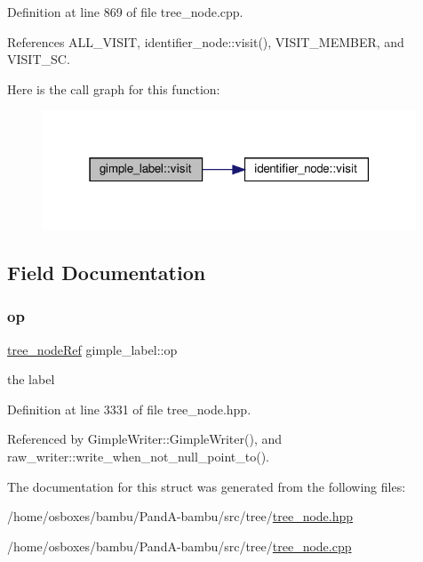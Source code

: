 Definition at line 869 of file tree\+\_\+node.\+cpp.



References A\+L\+L\+\_\+\+V\+I\+S\+IT, identifier\+\_\+node\+::visit(), V\+I\+S\+I\+T\+\_\+\+M\+E\+M\+B\+ER, and V\+I\+S\+I\+T\+\_\+\+SC.

Here is the call graph for this function\+:
\nopagebreak
\begin{figure}[H]
\begin{center}
\leavevmode
\includegraphics[width=315pt]{d3/d6c/structgimple__label_a7948e2a870e18e9a7c7d8a722a6fa26b_cgraph}
\end{center}
\end{figure}


\subsection{Field Documentation}
\mbox{\label{structgimple__label_aa87ea22f7cfff70f4149ff4212b70c69}} 
\subsubsection{\texorpdfstring{op}{op}}
{\footnotesize\ttfamily \hyperlink{tree__node_8hpp_a6ee377554d1c4871ad66a337eaa67fd5}{tree\+\_\+node\+Ref} gimple\+\_\+label\+::op}



the label 



Definition at line 3331 of file tree\+\_\+node.\+hpp.



Referenced by Gimple\+Writer\+::\+Gimple\+Writer(), and raw\+\_\+writer\+::write\+\_\+when\+\_\+not\+\_\+null\+\_\+point\+\_\+to().



The documentation for this struct was generated from the following files\+:\begin{DoxyCompactItemize}
\item 
/home/osboxes/bambu/\+Pand\+A-\/bambu/src/tree/\hyperlink{tree__node_8hpp}{tree\+\_\+node.\+hpp}\item 
/home/osboxes/bambu/\+Pand\+A-\/bambu/src/tree/\hyperlink{tree__node_8cpp}{tree\+\_\+node.\+cpp}\end{DoxyCompactItemize}
